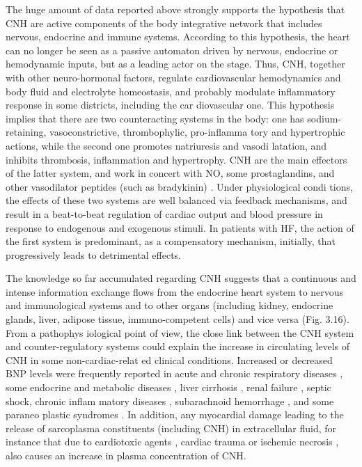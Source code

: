 \documentclass[14pt,a4paper,onecolumn]{extarticle}
\begin{document}
The huge amount of data reported above strongly supports the hypothesis that CNH are active components of the body integrative network that includes nervous, endocrine and immune systems. According to this hypothesis, the heart can no longer be seen as a passive automaton driven by nervous, endocrine or hemodynamic inputs, but as a leading actor on the stage. Thus, CNH, together with other neuro-hormonal factors, regulate cardiovascular hemodynamics and body fluid and electrolyte homeostasis, and probably modulate inflammatory response in some districts, including the car diovascular one. This hypothesis implies that there are two counteracting systems in the body: one has sodium-retaining, vasoconstrictive, thrombophylic, pro-inflamma tory and hypertrophic actions, while the second one promotes natriuresis and vasodi latation, and inhibits thrombosis, inflammation and hypertrophy. CNH are the main effectors of the latter system, and work in concert with NO, some prostaglandins, and other vasodilator peptides (such as bradykinin) \citep{116} \citep{117} \citep{118} \citep{119} \citep{120}. Under physiological condi tions, the effects of these two systems are well balanced via feedback mechanisms, and result in a beat-to-beat regulation of cardiac output and blood pressure in response to endogenous and exogenous stimuli. In patients with HF, the action of the first system is predominant, as a compensatory mechanism, initially, that progressively leads to detrimental effects.

The knowledge so far accumulated regarding CNH suggests that a continuous and intense information exchange flows from the endocrine heart system to nervous and immunological systems and to other organs (including kidney, endocrine glands, liver, adipose tissue, immuno-competent cells) and vice versa (Fig. 3.16). From a pathophys iological point of view, the close link between the CNH system and counter-regulatory systems could explain the increase in circulating levels of CNH in some non-cardiac-relat ed clinical conditions. Increased or decreased BNP levels were frequently reported in acute and chronic respiratory diseases \citep{121} \citep{122} \citep{123} \citep{124} \citep{125} \citep{126} \citep{127} \citep{128} \citep{129}, some endocrine and metabolic diseases \citep{130} \citep{131} \citep{132} \citep{133} \citep{134} \citep{135} \citep{136} \citep{137} \citep{138} \citep{139} \citep{140} \citep{141}, liver cirrhosis \citep{142} \citep{143} \citep{144}, renal failure \citep{100} \citep{144}, septic shock, chronic inflam matory diseases \citep{145} \citep{146} \citep{61} \citep{148} \citep{149}, subarachnoid hemorrhage \citep{150} \citep{153} \citep{152}, and some paraneo plastic syndromes \citep{154} \citep{155} \citep{156}. In addition, any myocardial damage leading to the release of sarcoplasma constituents (including CNH) in extracellular fluid, for instance that due to cardiotoxic agents \citep{157} \citep{158} \citep{159} \citep{160} \citep{161}, cardiac trauma or ischemic necrosis \citep{162} \citep{163}, also causes an increase in plasma concentration of CNH.
\end{document}
